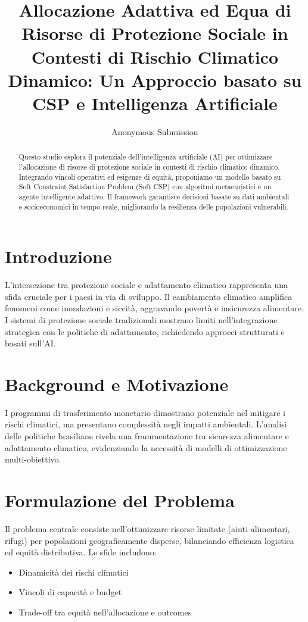 \documentclass[letterpaper]{article}
\title{Allocazione Adattiva ed Equa di Risorse di Protezione Sociale in Contesti di Rischio Climatico Dinamico: Un Approccio basato su CSP e Intelligenza Artificiale}
\author{Anonymous Submission}
\begin{document}
\maketitle

\begin{abstract}
Questo studio esplora il potenziale dell'intelligenza artificiale (AI) per ottimizzare l'allocazione di risorse di protezione sociale in contesti di rischio climatico dinamico. Integrando vincoli operativi ed esigenze di equità, proponiamo un modello basato su Soft Constraint Satisfaction Problem (Soft CSP) con algoritmi metaeuristici e un agente intelligente adattivo. Il framework garantisce decisioni basate su dati ambientali e socioeconomici in tempo reale, migliorando la resilienza delle popolazioni vulnerabili.
\end{abstract}

\section{Introduzione}
L'intersezione tra protezione sociale e adattamento climatico rappresenta una sfida cruciale per i paesi in via di sviluppo. Il cambiamento climatico amplifica fenomeni come inondazioni e siccità, aggravando povertà e insicurezza alimentare. I sistemi di protezione sociale tradizionali mostrano limiti nell'integrazione strategica con le politiche di adattamento, richiedendo approcci strutturati e basati sull'AI.

\section{Background e Motivazione}
I programmi di trasferimento monetario dimostrano potenziale nel mitigare i rischi climatici, ma presentano complessità negli impatti ambientali. L'analisi delle politiche brasiliane rivela una frammentazione tra sicurezza alimentare e adattamento climatico, evidenziando la necessità di modelli di ottimizzazione multi-obiettivo.

\section{Formulazione del Problema}
Il problema centrale consiste nell'ottimizzare risorse limitate (aiuti alimentari, rifugi) per popolazioni geograficamente disperse, bilanciando efficienza logistica ed equità distributiva. Le sfide includono:
\begin{itemize}
    \item Dinamicità dei rischi climatici
    \item Vincoli di capacità e budget
    \item Trade-off tra equità nell'allocazione e outcomes
\end{itemize}
\end{document}
